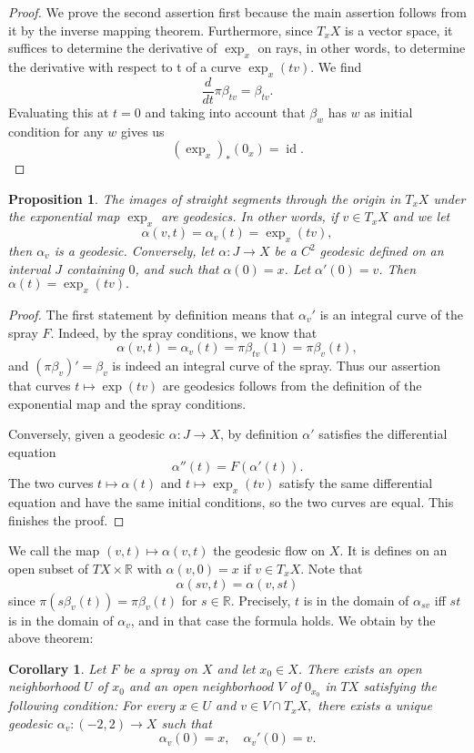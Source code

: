 \documentclass[a5paper,10pt,twoside]{article}
\newcommand{\R}{\ensuremath{\mathbb{R}}}
\DeclareMathOperator*{\id}{id}
\theoremstyle{plain}
\newtheorem{prop}[teo]{Proposition}
\newtheorem{cor}[teo]{Corollary}
\theoremstyle{definition}
\theoremstyle{remark}
\begin{document}
\begin{proof}
We prove the second assertion first because the main assertion
follows from it by the inverse mapping theorem. Furthermore, since $T_xX$ is
a vector space, it suffices to determine the derivative of $\exp_x$ on rays, in other words, to determine the derivative with respect to t of a curve $\exp_x(tv).$ We find
$$ \frac{d}{dt}\pi\beta_{tv}=\beta_{tv}.$$
Evaluating this at $t = 0$ and taking into account that $\beta_w$ has $w$ as initial condition for any $w$ gives us
$$ (\exp_x)_*(0_x)=\id.$$
\end{proof}

\begin{prop}
The images of straight segments through the origin in $T_xX$ under the exponential map $\exp_x$ are geodesics. In other words, if $v\in T_xX$ and we let 
$$
\alpha(v,t)=\alpha_v(t)=\exp_x(tv),
$$
then $\alpha_v$ is a geodesic. Conversely, let $\alpha:J\to X$ be a $C^2$ geodesic defined on an interval $J$ containing $0$, and such that $\alpha(0)=x$. Let $\alpha'(0)=v$. Then $\alpha(t)=\exp_x(tv).$
\end{prop}

\begin{proof}
The first statement by definition means that $\alpha_v'$ is an integral
curve of the spray $F.$ Indeed, by the spray conditions, we know that
$$
\alpha(v,t)=\alpha_v(t)=\pi\beta_{tv}(1)=\pi\beta_v(t),
$$
and $(\pi\beta_v)'=\beta_v$ is  indeed an integral curve of the spray. Thus our assertion that curves $t\mapsto \exp(tv)$ are geodesics follows from the definition of the exponential map and the spray conditions.

Conversely, given a geodesic $\alpha: J\to X$, by definition $\alpha'$ satisfies the differential equation $$\alpha''(t)=F\left(\alpha'(t)\right).$$ The two curves $t\mapsto \alpha(t)$ and $t\mapsto\exp_x(tv)$ satisfy the  same differential equation and have the same initial conditions, so the two curves are equal. This finishes the proof.
\end{proof}

We call the map $(v,t)\mapsto\alpha(v,t)$ the geodesic flow on $X.$ It is defines on an open subset of $TX\times\R$ with $\alpha(v,0)=x$ if $v\in T_xX.$ Note that
$$
\alpha(sv,t)=\alpha(v,st)
$$
since $\pi\left(s\beta_v(t)\right)=\pi\beta_v(t)$ for $s\in\R$. Precisely, $t$ is in the domain of $\alpha_{sv}$ iff $st$ is in the domain of $\alpha_v$, and in that case the formula holds. We obtain by the above theorem:

\begin{cor}
Let $F$ be a spray on $X$ and let $x_0\in X$. There exists an open neighborhood $U$ of $x_0$ and an open neighborhood $V$ of $0_{x_0}$ in $TX$ satisfying the following condition: For every $x\in U$ and $v\in V\cap T_xX,$ there exists a unique geodesic $\alpha_v:(-2,2)\to X$ such that 
$$
\alpha_v(0)=x,\quad \alpha_v'(0)=v.
$$
\end{cor}
\end{document}
